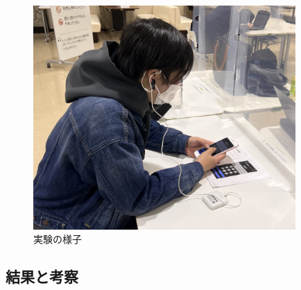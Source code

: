 \begin{figure}[htbp]
  \begin{minipage}{\hsize}
    \begin{center}
       \includegraphics[width=100mm]{img/experience.jpg}
    \end{center}
    \caption{実験の様子}
    \label{fig:observe}
  \end{minipage}
\end{figure}

\subsection{結果と考察}